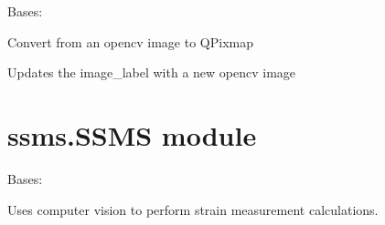 \documentclass[letterpaper,10pt,english]{sphinxmanual}
\begin{document}
\begin{fulllineitems}
\label{\detokenize{ssms:ssms.Display.Display}}
Bases: 

\begin{fulllineitems}
\label{\detokenize{ssms:ssms.Display.Display.convert_cv_qt}}
Convert from an opencv image to QPixmap

\end{fulllineitems}


\begin{fulllineitems}
\label{\detokenize{ssms:ssms.Display.Display.update_image}}
Updates the image\_label with a new opencv image

\end{fulllineitems}


\end{fulllineitems}



\section{ssms.SSMS module}
\label{\detokenize{ssms:module-ssms.SSMS}}\label{\detokenize{ssms:ssms-ssms-module}}

\begin{fulllineitems}
\label{\detokenize{ssms:ssms.SSMS.SSMS}}
Bases: 

Uses computer vision to perform strain measurement calculations.

\end{fulllineitems}
\end{document}
